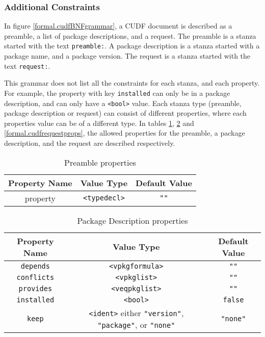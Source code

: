 \subsubsection{Additional Constraints}
In figure \ref{formal.cudfBNFgrammar}, a CUDF document is described as a preamble, a list of package descriptions, and a request.
The preamble is a stanza started with the text \verb+preamble:+.
A package description is a stanza started with a package name, and a package version.
The request is a stanza started with the text \verb+request:+.

This grammar does not list all the constraints for each stanza, and each property.
For example, the property with key \verb+installed+ can only be in a package description, and can only have a \verb+<bool>+ value.
Each stanza type (preamble, package description or request) can consist of different properties, where each properties value can be of a different type.
In tables \ref{formal.cudfpremableprops}, \ref{formal.cudfpdprops} and \ref{formal.cudfrequestprops}, 
the allowed properties for the preamble, a package description, and the request are described respectively.

\begin{table}
\begin{tabular}{|c|c|c|}
Property Name & Value Type & Default Value \\ \hline
property & \verb+<typedecl>+ & \verb+""+
\end{tabular}
\caption{Preamble properties}
\label{formal.cudfpremableprops}
\end{table}

\begin{table}
\begin{tabular}{|c|c|c|}
Property Name & Value Type & Default Value \\ \hline
\texttt{depends} & \verb+<vpkgformula>+ & \verb+""+ \\
\texttt{conflicts} & \verb+<vpkglist>+ & \verb+""+ \\ 
\texttt{provides} & \verb+<veqpkglist>+ & \verb+""+ \\ 
\texttt{installed} & \verb+<bool>+ & \verb+false+ \\ 
\texttt{keep} & \texttt{<ident>} either \texttt{"version"}, \texttt{"package"}, or \texttt{"none"} & \texttt{"none"} \\ 
\end{tabular}
\caption{Package Description properties}
\label{formal.cudfpdprops}
\end{table}

